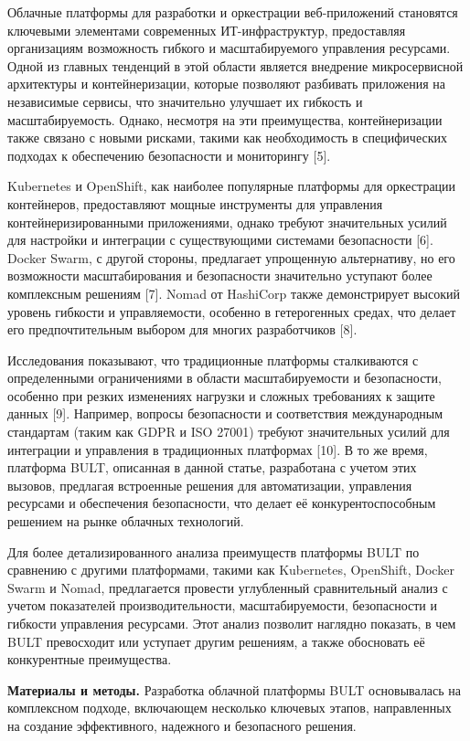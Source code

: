 {Облачные платформы для разработки и оркестрации веб-приложений
становятся ключевыми элементами современных ИТ-инфраструктур,
предоставляя организациям возможность гибкого и масштабируемого
управления ресурсами. Одной из главных тенденций в этой области является
внедрение микросервисной архитектуры и контейнеризации, которые
позволяют разбивать приложения на независимые сервисы, что значительно
улучшает их гибкость и масштабируемость. Однако, несмотря на эти
преимущества, контейнеризации также связано с новыми рисками, такими как
необходимость в специфических подходах к обеспечению безопасности и
мониторингу {[}5{]}.

Kubernetes и OpenShift, как наиболее популярные платформы для
оркестрации контейнеров, предоставляют мощные инструменты для управления
контейнеризированными приложениями, однако требуют значительных усилий
для настройки и интеграции с существующими системами безопасности
{[}6{]}. Docker Swarm, с другой стороны, предлагает упрощенную
альтернативу, но его возможности масштабирования и безопасности
значительно уступают более комплексным решениям {[}7{]}. Nomad от
HashiCorp также демонстрирует высокий уровень гибкости и управляемости,
особенно в гетерогенных средах, что делает его предпочтительным выбором
для многих разработчиков {[}8{]}.

Исследования показывают, что традиционные платформы сталкиваются с
определенными ограничениями в области масштабируемости и безопасности,
особенно при резких изменениях нагрузки и сложных требованиях к защите
данных {[}9{]}. Например, вопросы безопасности и соответствия
международным стандартам (таким как GDPR и ISO 27001) требуют
значительных усилий для интеграции и управления в традиционных
платформах {[}10{]}. В то же время, платформа BULT, описанная в данной
статье, разработана с учетом этих вызовов, предлагая встроенные решения
для автоматизации, управления ресурсами и обеспечения безопасности, что
делает её конкурентоспособным решением на рынке облачных технологий.

Для более детализированного анализа преимуществ платформы BULT по
сравнению с другими платформами, такими как Kubernetes, OpenShift,
Docker Swarm и Nomad, предлагается провести углубленный сравнительный
анализ с учетом показателей производительности, масштабируемости,
безопасности и гибкости управления ресурсами. Этот анализ позволит
наглядно показать, в чем BULT превосходит или уступает другим решениям,
а также обосновать её конкурентные преимущества.

{\bfseries Материалы и методы.} Разработка облачной платформы BULT
основывалась на комплексном подходе, включающем несколько ключевых
этапов, направленных на создание эффективного, надежного и безопасного
решения.

}
